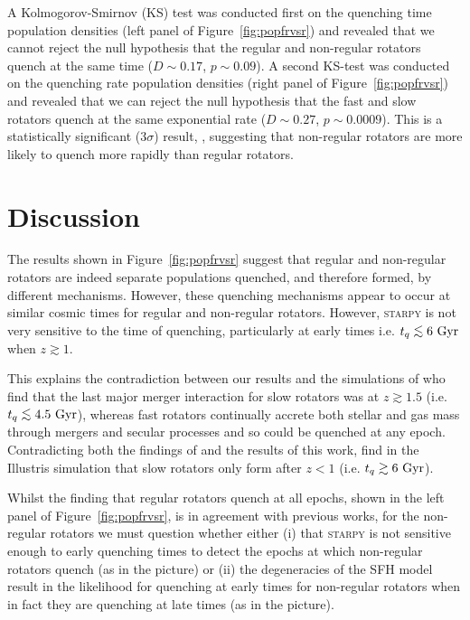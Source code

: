 \documentclass[useAMS,usenatbib]{mn2e}
\def\lesssim{\mathrel{\hbox{\rlap{\hbox{\lower3pt\hbox{$\sim$}}}\hbox{\raise2pt\hbox{$<$}}}}}
\begin{document}
A Kolmogorov-Smirnov (KS) test was conducted first on the quenching time population densities (left panel of Figure~\ref{fig:popfrvsr}) and revealed that we cannot reject the null hypothesis that the regular and non-regular rotators quench at the same time ($D \sim 0.17$, $p \sim 0.09$). A second KS-test was conducted on the quenching rate population densities (right panel of Figure~\ref{fig:popfrvsr}) and revealed that we can reject the null hypothesis that the fast and slow rotators quench at the same exponential rate ($D \sim 0.27$, $p \sim 0.0009$). This is a statistically significant ($3\sigma$) result, , suggesting that non-regular rotators are more likely to quench more rapidly than regular rotators.


\section{Discussion}\label{sec:discussion}

The results shown in Figure~\ref{fig:popfrvsr} suggest that regular and non-regular rotators are indeed separate populations quenched, and therefore formed, by different mechanisms. However, these quenching mechanisms appear to occur at similar cosmic times for regular and non-regular rotators. However, \textsc{starpy} is not very sensitive to the time of quenching, particularly at early times i.e. $t_q \lesssim 6~\rm{Gyr}$ when $z \gtrsim 1$. 

This explains the contradiction between our results and the simulations of \cite{khochfar11} who find that the last major merger interaction for slow rotators was at $z \gtrsim 1.5$ (i.e. $t_q \lesssim 4.5~\rm{Gyr}$), whereas fast rotators continually accrete both stellar and gas mass through mergers and secular processes and so could be quenched at any epoch. Contradicting both the findings of \cite{khochfar11} and the results of this work, \cite{penoyre17} find in the Illustris simulation that slow rotators only form after $z < 1$ (i.e. $t_q \gtrsim 6~\rm{Gyr}$). 

Whilst the finding that regular rotators quench at all epochs, shown in the left panel of Figure~\ref{fig:popfrvsr}, is in agreement with previous works, for the non-regular rotators we must question whether either (i) that \textsc{starpy} is not sensitive enough to early quenching times to detect the epochs at which non-regular rotators quench (as in the \citealt{khochfar11} picture) or (ii) the degeneracies of the SFH model result in the likelihood for quenching at early times for non-regular rotators when in fact they are quenching at late times (as in the \citealt{penoyre17} picture).
\end{document}
